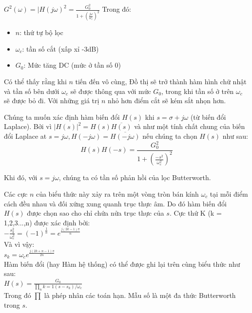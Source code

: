 $G^2(\omega) = \vert{H(j\omega)}^2 = \frac{G_0^2}{1+(\frac{j\omega}{\omega_c})^2}$
Trong đó:
\begin{center}
    \begin{itemize}
        \item $n$: thứ tự bộ lọc 
        \item $\omega_c$: tần số cắt (xấp xỉ -3dB)
        \item $G_0$: Mức tăng DC (mức ở tần số 0)
    \end{itemize}
\end{center}
Có thể thấy rằng khi $n$ tiến đến vô cùng, Đồ thị sẽ trở thành hàm hình chữ nhật và tần số bên dưới $\omega_c$ sẽ được thông qua với mức $G_0$, trong khi tần số ở trên $\omega_c$ sẽ được bỏ đi. Với những giá trị $n$ nhỏ hơn điểm cắt sẽ kém sắt nhọn hơn.

Chúng ta muốn xác định hàm biến đổi $H(s)$ khi $s = \sigma + j\omega$ (từ biến đổi Laplace). Bởi vì $\vert H(s) \vert^2 = H(s)\overline{H(s)}$ và như một tính chất chung của biến đổi Laplace
at $s = j\omega, H(-j\omega) = \overline{H(-j\omega)}$ nếu chúng ta chọn $H(s)$ như sau:
\begin{equation}
H(s)H(-s)=\frac{G_0^2}{1+(\frac{-s^2}{\omega_c^2})^2}
\label{eq:Hs}
\end{equation}

Khi đó, với $s = j\omega$, chúng ta có tần số phản hồi của lọc Butterworth.

Các cực $n$ của biểu thức này xảy ra trên một vòng tròn bán kính $\omega_c$ tại mỗi điểm cách đều nhau và đối xứng xung quanh trục thực âm. Do đó hàm biến đổi $H(s)$ được chọn sao cho chỉ chứa nửa trục thực của $s$. Cực thứ K (k = 1,2,3...,n) được xác định bởi:\\

$-\frac{s_k^2}{\omega_c^2} = (-1)^\frac{1}{n} = e^\frac{j(2k-1)\pi}{n}$ \\

Và vì vậy: \\

$s_k = \omega_c e^\frac{j(2k+n-1)\pi}{2n}$ \\

Hàm biến đổi (hay Hàm hệ thống) có thể được ghi lại trên cùng biểu thức như sau: \\

$H(s) = \frac{G_0}{\prod_{n}{k=1}(s - s_k)/\omega_c}$ \\

Trong đó $\prod$ là phép nhân các toán hạn. Mẫu số là một đa thức Butterworth trong $s$.

